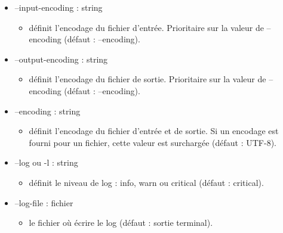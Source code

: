 \documentclass[manual-fr.tex]{subfiles}
\begin{document}
\begin{itemize}
\begin{itemize}
            \item[] --input-encoding : string
                \begin{itemize}
                    \item[] définit l'encodage du fichier d'entrée. Prioritaire sur la valeur de --encoding (défaut : --encoding).
                \end{itemize}
            \item[] --output-encoding : string
                \begin{itemize}
                    \item[] définit l'encodage du fichier de sortie. Prioritaire sur la valeur de --encoding (défaut : --encoding).
                \end{itemize}
            \item[] --encoding : string
                \begin{itemize}
                    \item[] définit l'encodage du fichier d'entrée et de sortie. Si un encodage est fourni pour un fichier,
                        cette valeur est surchargée (défaut : UTF-8).
                \end{itemize}
            \item[] --log ou -l : string
                \begin{itemize}
                    \item[] définit le niveau de log : info, warn ou critical (défaut : critical).
                \end{itemize}
            \item[] --log-file : fichier
                \begin{itemize}
                    \item[] le fichier où écrire le log (défaut : sortie terminal).
                \end{itemize}
        \end{itemize}
\end{itemize}
\end{document}
